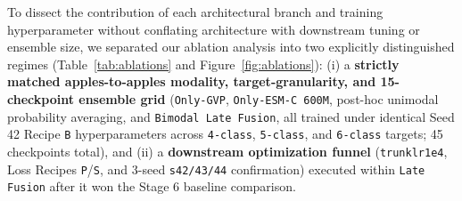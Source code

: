 \documentclass[10pt,a4paper,twocolumn]{article}
\begin{document}
To dissect the contribution of each architectural branch and training hyperparameter without conflating architecture with downstream tuning or ensemble size, we separated our ablation analysis into two explicitly distinguished regimes (Table~\ref{tab:ablations} and Figure~\ref{fig:ablations}): (i) a \textbf{strictly matched apples-to-apples modality, target-granularity, and 15-checkpoint ensemble grid} (\texttt{Only-GVP}, \texttt{Only-ESM-C 600M}, post-hoc unimodal probability averaging, and \texttt{Bimodal Late Fusion}, all trained under identical Seed 42 Recipe \texttt{B} hyperparameters across \texttt{4-class}, \texttt{5-class}, and \texttt{6-class} targets; 45 checkpoints total), and (ii) a \textbf{downstream optimization funnel} (\texttt{trunklr1e4}, Loss Recipes \texttt{P}/\texttt{S}, and 3-seed \texttt{s42/43/44} confirmation) executed within \texttt{Late Fusion} after it won the Stage 6 baseline comparison.
\end{document}
